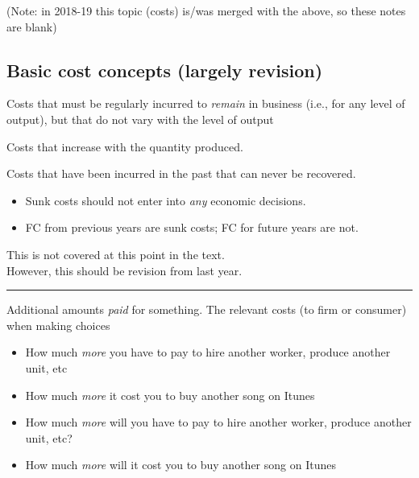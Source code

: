 \documentclass[]{article}
\providecommand{\tightlist}{%
  \setlength{\itemsep}{0pt}\setlength{\parskip}{0pt}}
\begin{document}
(Note: in 2018-19 this topic (costs) is/was merged with the above, so
these notes are blank)

\hypertarget{basic-cost-concepts-largely-revision}{%
\subsection{Basic cost concepts (largely
revision)}\label{basic-cost-concepts-largely-revision}}

\begin{description}
\tightlist
\item[Fixed costs (FC)]
Costs that must be regularly incurred to \emph{remain} in business
(i.e., for any level of output), but that do not vary with the level of
output
\end{description}

\begin{description}
\tightlist
\item[Variable costs (VC)]
Costs that increase with the quantity produced.
\end{description}

\begin{description}
\tightlist
\item[Sunk costs]
Costs that have been incurred in the past that can never be recovered.
\end{description}

\begin{itemize}
\tightlist
\item
  Sunk costs should not enter into \emph{any} economic decisions.
\item
  FC from previous years are sunk costs; FC for future years are not.
\end{itemize}

This is not covered at this point in the text.\\
However, this should be revision from last year.

\begin{center}\rule{0.5\linewidth}{\linethickness}\end{center}

\begin{description}
\tightlist
\item[Economic costs (DR)]
Additional amounts \emph{paid} for something. The relevant costs (to
firm or consumer) when making choices
\end{description}

\begin{itemize}
\item
  How much \emph{more} you have to pay to hire another worker, produce
  another unit, etc
\item
  How much \emph{more} it cost you to buy another song on Itunes
\item
  How much \emph{more} will you have to pay to hire another worker,
  produce another unit, etc?
\item
  How much \emph{more} will it cost you to buy another song on Itunes
\end{itemize}
\end{document}
